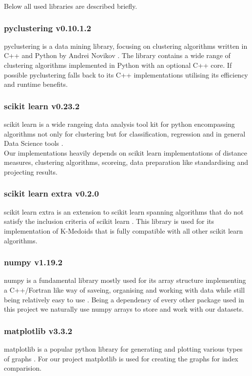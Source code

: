 Below all used libraries are described briefly.

\subsubsection[pyclustering]{pyclustering v0.10.1.2}
pyclustering is a data mining library, focusing on clustering algorithms written in C++ and Python by Andrei Novikov \cite{Novikov2019}. The library contains a wide range of clustering algorithms implemented in Python with an optional C++ core. If possible pyclustering falls back to its C++ implementations utilising its efficiency and runtime benefits.

\subsubsection[scikit learn]{scikit learn v0.23.2}
scikit learn is a wide rangeing data analysis tool kit for python encompassing algorithms not only for clustering but for classification, regression and in general Data Science tools \cite{scikitlearn}.\\
Our implementations heavily depends on scikit learn implementations of distance measures, clustering algorithms, scoreing, data preparation like standardising and projecting results. 

\subsubsection[scikit learn extra]{scikit learn extra v0.2.0}
scikit learn extra is an extension to scikit learn spanning algorithms that do not satisfy the inclusion criteria of scikit learn \cite{scikit-learn-extra}. This library is used for its implementation of K-Medoids that is fully compatible with all other scikit learn algorithms.

\subsubsection[numpy]{numpy v1.19.2}
numpy is a fundamental library mostly used for its array structure implementing a C++/Fortran like way of saveing, organising and working with data while still being relatively easy to use \cite{numpy}. Being a dependency of every other package used in this project we naturally use numpy arrays to store and work with our datasets.

\subsubsection[matplotlib]{matplotlib v3.3.2}
matplotlib is a popular python library for generating and plotting various types of graphs \cite{Hunter:2007}. For our project matplotlib is used for creating the graphs for index comparision.


